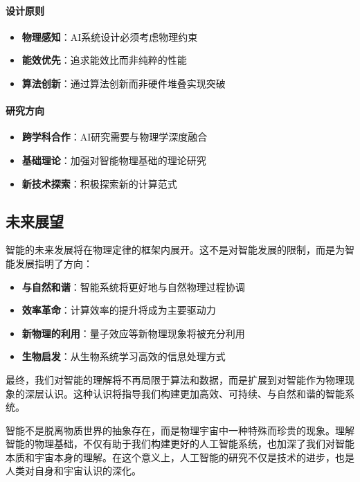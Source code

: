 \paragraph{设计原则}
\begin{itemize}
\item \textbf{物理感知}：AI系统设计必须考虑物理约束
\item \textbf{能效优先}：追求能效比而非纯粹的性能
\item \textbf{算法创新}：通过算法创新而非硬件堆叠实现突破
\end{itemize}

\paragraph{研究方向}
\begin{itemize}
\item \textbf{跨学科合作}：AI研究需要与物理学深度融合
\item \textbf{基础理论}：加强对智能物理基础的理论研究
\item \textbf{新技术探索}：积极探索新的计算范式
\end{itemize}

\subsection{未来展望}

智能的未来发展将在物理定律的框架内展开。这不是对智能发展的限制，而是为智能发展指明了方向：

\begin{itemize}
\item \textbf{与自然和谐}：智能系统将更好地与自然物理过程协调
\item \textbf{效率革命}：计算效率的提升将成为主要驱动力
\item \textbf{新物理的利用}：量子效应等新物理现象将被充分利用
\item \textbf{生物启发}：从生物系统学习高效的信息处理方式
\end{itemize}

最终，我们对智能的理解将不再局限于算法和数据，而是扩展到对智能作为物理现象的深层认识。这种认识将指导我们构建更加高效、可持续、与自然和谐的智能系统。

智能不是脱离物质世界的抽象存在，而是物理宇宙中一种特殊而珍贵的现象。理解智能的物理基础，不仅有助于我们构建更好的人工智能系统，也加深了我们对智能本质和宇宙本身的理解。在这个意义上，人工智能的研究不仅是技术的进步，也是人类对自身和宇宙认识的深化。